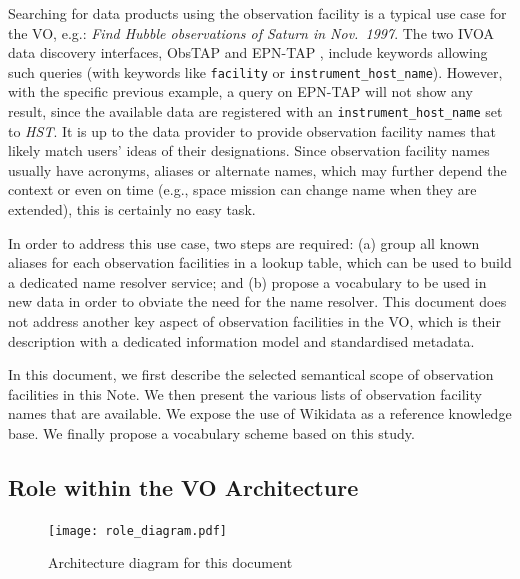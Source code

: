 \documentclass[11pt,a4paper]{ivoa}
\begin{document}
Searching for data products using the observation facility is a 
typical use case for the VO, e.g.: \emph{Find Hubble observations
of Saturn in Nov.\ 1997}. The two IVOA data discovery interfaces, 
ObsTAP \citep{2017ivoa.spec.0509L} and EPN-TAP \citep{ivoa:epntap}, 
include keywords allowing such queries (with keywords like 
\texttt{facility} or \texttt{instrument\_host\_name}). However, with 
the specific previous example, a query on EPN-TAP will not show any 
result, since the available data are registered with an 
\texttt{instrument\_host\_name} set to \emph{HST}. It is up to the 
data provider to provide observation facility names that likely match
users' ideas of their designations.  Since
observation facility names usually have acronyms, aliases or alternate 
names, which may further depend the context or even on 
time (e.g., space mission can change name when they are extended), this
is certainly no easy task.

In order to address this use case, two steps are required: (a) group
all known aliases for each observation facilities in a lookup table, 
which can be used to build a dedicated name resolver service; and 
(b) propose a vocabulary to be used in new data in order to obviate the
need for the name resolver.
This document does not address another key
aspect of observation facilities in the VO, which is their 
description with a dedicated information model and standardised 
metadata.

In this document, we first describe the selected semantical scope of 
observation facilities in this Note. We then present the various 
lists of observation facility names that are available. We expose the 
use of Wikidata as a reference knowledge base. We finally propose a 
vocabulary scheme based on this study. 

\subsection{Role within the VO Architecture}

\begin{figure}
\centering


\texttt{[image: role\_diagram.pdf]}
\caption{Architecture diagram for this document}
\label{fig:archdiag}
\end{figure}
\end{document}
